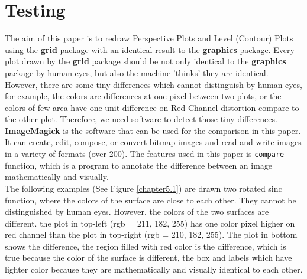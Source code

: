 \documentclass[11pt,twoside]{report}
\begin{document}
\chapter{Testing}
The aim of this paper is to redraw Perspective Plots and Level (Contour) Plots using the \textbf{grid} package with an identical result to the \textbf{graphics} package. Every plot drawn by the \textbf{grid} package should be not only identical to the \textbf{graphics} package by human eyes, but also the machine 'thinks' they are identical. However, there are some tiny differences which cannot distinguish by human eyes, for example, the colors are differences at one pixel between two plots, or the colors of few area have one unit difference on Red Channel distortion compare to the other plot. Therefore, we need software to detect those tiny differences.\\

\textbf{ImageMagick} \citep{ImageMagick} is the software that can be used for the comparison in this paper. It can create, edit, compose, or convert bitmap images and read and write images in a variety of formats (over 200). The features used in this paper is \texttt{compare} function, which is a program to annotate the difference between an image mathematically and visually.\\

The following examples (See Figure \ref{chapter5.1}) are drawn two rotated sinc function, where the colors of the surface are close to each other. They cannot be distinguished by human eyes. However, the colors of the two surfaces are different. the plot in top-left (rgb = 211, 182, 255) has one color pixel higher on red channel than the plot in top-right (rgb = 210, 182, 255). The plot in bottom shows the difference, the region filled with red color is the difference, which is true because the color of the surface is different, the box and labels which have lighter color because they are mathematically and visually identical to each other. \\
\end{document}
